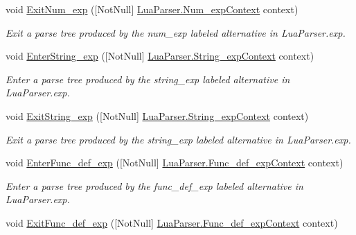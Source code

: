 \begin{DoxyCompactItemize}
void \mbox{\hyperlink{interfacezlua_1_1_i_lua_listener_ae345a5af97b04861ba3ce16cf1e33808}{Exit\+Num\+\_\+exp}} (\mbox{[}Not\+Null\mbox{]} \mbox{\hyperlink{classzlua_1_1_lua_parser_1_1_num__exp_context}{Lua\+Parser.\+Num\+\_\+exp\+Context}} context)
\begin{DoxyCompactList}\small\item\em Exit a parse tree produced by the {\ttfamily num\+\_\+exp} labeled alternative in Lua\+Parser.\+exp. \end{DoxyCompactList}\item 
void \mbox{\hyperlink{interfacezlua_1_1_i_lua_listener_a8e9361d3a88bf9fe02b6be1b7aa3f066}{Enter\+String\+\_\+exp}} (\mbox{[}Not\+Null\mbox{]} \mbox{\hyperlink{classzlua_1_1_lua_parser_1_1_string__exp_context}{Lua\+Parser.\+String\+\_\+exp\+Context}} context)
\begin{DoxyCompactList}\small\item\em Enter a parse tree produced by the {\ttfamily string\+\_\+exp} labeled alternative in Lua\+Parser.\+exp. \end{DoxyCompactList}\item 
void \mbox{\hyperlink{interfacezlua_1_1_i_lua_listener_adaa28943f1961d32164acc489c86f308}{Exit\+String\+\_\+exp}} (\mbox{[}Not\+Null\mbox{]} \mbox{\hyperlink{classzlua_1_1_lua_parser_1_1_string__exp_context}{Lua\+Parser.\+String\+\_\+exp\+Context}} context)
\begin{DoxyCompactList}\small\item\em Exit a parse tree produced by the {\ttfamily string\+\_\+exp} labeled alternative in Lua\+Parser.\+exp. \end{DoxyCompactList}\item 
void \mbox{\hyperlink{interfacezlua_1_1_i_lua_listener_a4f05c6d0e5bd9d2515029fd34d8f5402}{Enter\+Func\+\_\+def\+\_\+exp}} (\mbox{[}Not\+Null\mbox{]} \mbox{\hyperlink{classzlua_1_1_lua_parser_1_1_func__def__exp_context}{Lua\+Parser.\+Func\+\_\+def\+\_\+exp\+Context}} context)
\begin{DoxyCompactList}\small\item\em Enter a parse tree produced by the {\ttfamily func\+\_\+def\+\_\+exp} labeled alternative in Lua\+Parser.\+exp. \end{DoxyCompactList}\item 
void \mbox{\hyperlink{interfacezlua_1_1_i_lua_listener_aa77991290b4d2ef6e498e68343ad8b28}{Exit\+Func\+\_\+def\+\_\+exp}} (\mbox{[}Not\+Null\mbox{]} \mbox{\hyperlink{classzlua_1_1_lua_parser_1_1_func__def__exp_context}{Lua\+Parser.\+Func\+\_\+def\+\_\+exp\+Context}} context)

\end{DoxyCompactItemize}
